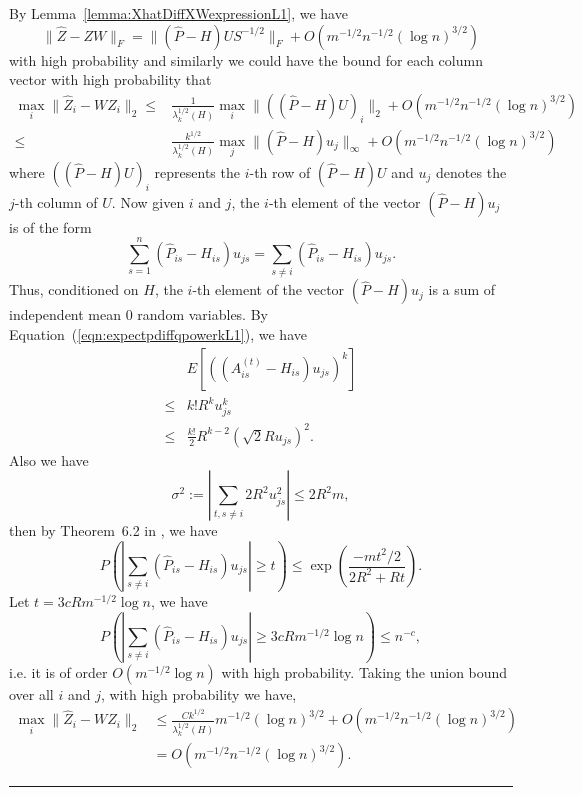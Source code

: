 \documentclass[a4paper]{article}
\newenvironment{proof}{{\bf Proof:  }}{\hfill\rule{2mm}{2mm}}
\renewcommand{\hat}{\widehat}
\begin{document}
\begin{proof}
By Lemma~\ref{lemma:XhatDiffXWexpressionL1}, we have
\[
	\|\hat{Z} - Z W\|_F = \| (\hat{P} - H) U S^{-1/2} \|_F + O(m^{-1/2} n^{-1/2} (\log n)^{3/2})
\]
 with high probability and similarly we could have the bound for each column vector with high probability that
\begin{align*}
	\max_i \| \hat{Z}_i - W Z_i \|_2
    \le & \frac{1}{\lambda_k^{1/2}(H)} \max_i \| ((\hat{P} - H) U)_i \|_2 + O(m^{-1/2} n^{-1/2} (\log n)^{3/2}) \\
    \le & \frac{k^{1/2}}{\lambda_k^{1/2}(H)} \max_j \| (\hat{P} - H) u_j \|_{\infty} + O(m^{-1/2} n^{-1/2} (\log n)^{3/2})
\end{align*}
where $((\hat{P} - H) U)_i$ represents the $i$-th row of $(\hat{P} - H) U$ and $u_j$ denotes the $j$-th column of $U$. Now given $i$ and $j$, the $i$-th element of the vector $(\hat{P} - H) u_j$ is of the form
\[
	\sum_{s=1}^n (\hat{P}_{is} - H_{is}) u_{js} = \sum_{s \ne i} (\hat{P}_{is} - H_{is}) u_{js}.
\]
Thus, conditioned on $H$, the $i$-th element of the vector $(\hat{P} - H) u_j$ is a sum of independent mean 0 random variables.
By Equation~(\ref{eqn:expectpdiffqpowerkL1}), we have
\begin{align*}
	& E\left[\left((A^{(t)}_{is} - H_{is}) u_{js}\right)^k\right] \\ 
    \le & k! R^k u_{js}^k \\
    \le & \frac{k!}{2} R^{k-2} (\sqrt{2} R u_{js})^2.
\end{align*}
Also we have
\[
	\sigma^2 := |\sum_{t, s \ne i} 2 R^2 u_{js}^2| \le 2 R^2 m,
\]
then by Theorem~6.2 in \citep{tropp2012user}, we have
\[
	P \left( \left| \sum_{s \ne i} (\hat{P}_{is} - H_{is}) u_{js} \right| \ge t \right)
    \le \exp \left( \frac{-m t^2/2}{2 R^2 + R t} \right).
\]
Let $t = 3 c R m^{-1/2} \log n$, we have
\[
	P \left( \left| \sum_{s \ne i} (\hat{P}_{is} - H_{is}) u_{js} \right| \ge 3 c R m^{-1/2} \log n \right)
    \le n^{-c},
\]
i.e. it is of order $O(m^{-1/2} \log n)$ with high probability.
Taking the union bound over all $i$ and $j$, with high probability we have,
\begin{align*}
	\max_i \| \hat{Z}_i - W Z_i \|_2
    & \le \frac{C k^{1/2}}{\lambda_k^{1/2}(H)} m^{-1/2} (\log n)^{3/2} + O(m^{-1/2} n^{-1/2} (\log n)^{3/2}) \\
    & = O(m^{-1/2} n^{-1/2} (\log n)^{3/2}).
\end{align*}
\end{proof}
\end{document}
